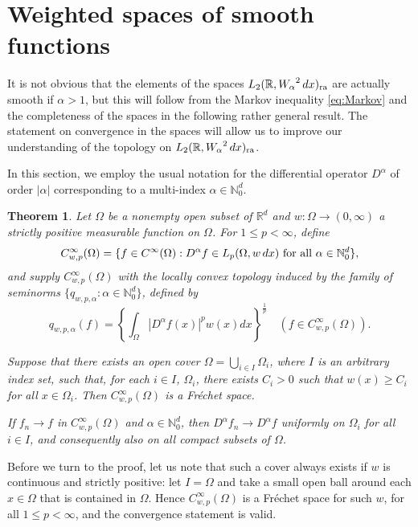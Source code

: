 \documentclass[12pt, reqno]{amsart}
\numberwithin{equation}{section}
\theoremstyle{plain}
\newtheorem{theorem}{Theorem}[section]
\theoremstyle{definition}
\begin{document}
\section{Weighted spaces of smooth functions}\label{sec:weighted spacesofsmoothfunctions}

It is not obvious that the elements of the spaces ${L_2({{\mathbb R}},{W_\alpha}^2\,dx)_{\textup{ra}}}$ are actually smooth if $\alpha>1$, but this will follow from the Markov inequality \eqref{eq:Markov} and the completeness of the spaces in the following rather general result. The statement on convergence in the spaces will allow us to improve our understanding of the topology on ${L_2({{\mathbb R}},{W_\alpha}^2\,dx)_{\textup{ra}}}$.

In this section, we employ the usual notation for the differential operator $D^\alpha$ of order $|\alpha|$ corresponding to a multi-index $\alpha\in{{\mathbb N}}_0^d$.

\begin{theorem}\label{the:generalFrechet}
Let $\Omega$ be a nonempty open subset of ${{\mathbb R}}^d$ and $w:\Omega\to (0,\infty)$ a strictly positive measurable function on $\Omega$. For  $1\leq p<\infty$, define
\begin{equation*}
{{C_{w,p}^\infty(\Omega)}} =\{f\in C^{\infty}(\Omega):D^\alpha f\in L_{p}(\Omega, w\,dx) \textup{ for all } \alpha\in{{\mathbb N}}_0^d\},
\end{equation*}
and supply ${{C_{w,p}^\infty(\Omega)}}$ with the locally convex topology induced by the family of seminorms $\{{{q_{w,p,\alpha}}} : \alpha\in{{\mathbb N}}_0^d\}$, defined by
\begin{equation*}
{{q_{w,p,\alpha}}}(f)=\left\{\int_{\Omega}|D^\alpha f(x)|^{p}w(x)dx\right\}^{\frac{1}{p}}\quad(f\in{{C_{w,p}^\infty(\Omega)}}).
\end{equation*}

Suppose that there exists an open cover $\Omega=\bigcup_{i \in I}\Omega_{i}$, where $I$ is an arbitrary index set, such that, for each $i \in I$, $\Omega_i$, there exists $C_i>0$ such that $w(x)\geq C_i$ for all $x\in \Omega_i$. Then ${{C_{w,p}^\infty(\Omega)}}$ is a Fr\'echet space.

If $f_n\to f$ in ${{C_{w,p}^\infty(\Omega)}}$ and $\alpha\in{{\mathbb N}}_0^d$, then $D^\alpha f_n\to D^\alpha f$ uniformly on $\Omega_i$ for all $i\in I$, and consequently also on all compact subsets of $\Omega$.
\end{theorem}

Before we turn to the proof, let us note that such a cover always exists if $w$ is continuous and strictly positive: let $I=\Omega$ and take a small open ball around each $x\in\Omega$ that is contained in $\Omega$. Hence ${{C_{w,p}^\infty(\Omega)}}$ is a Fr\'echet space for such $w$, for all $1 \leq p<\infty$, and the convergence statement is valid.
\end{document}
